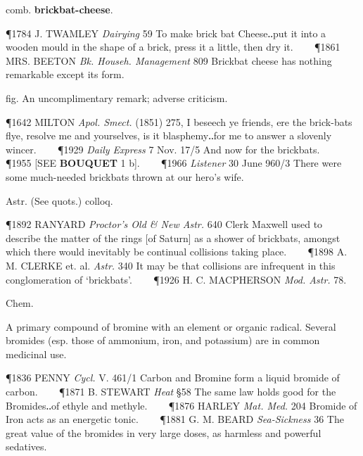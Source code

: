 \begin{description}[wide, labelwidth=!, labelindent=0pt]
\begin{myenumerate}
 comb. \textbf{brickbat-cheese}.

\P 1784 J. TWAMLEY  \textit{Dairying} 59 To make brick bat Cheese‥put it into a wooden mould in the shape of a brick, press it a little, then dry it.    
\P 1861 MRS. BEETON  \textit{Bk. Househ. Management} 809 Brickbat cheese has nothing remarkable except its form.

 fig. An uncomplimentary remark; adverse criticism.

\P 1642 MILTON  \textit{Apol. Smect.} (1851) 275, I beseech ye friends, ere the brick-bats flye, resolve me and yourselves, is it blasphemy‥for me to answer a slovenly wincer.    
\P 1929 \textit{Daily  Express} 7 Nov. 17/5 And now for the brickbats.    
\P 1955 [SEE  \textbf{BOUQUET} 1 b].    
\P 1966 \textit{Listener}  30 June 960/3 There were some much-needed brickbats thrown at our hero's wife.

 Astr. (See quots.) colloq.

\P 1892 RANYARD  \textit{Proctor's Old \& New Astr.} 640 Clerk Maxwell used to describe the matter of the rings [of Saturn] as a shower of brickbats, amongst which there would inevitably be continual collisions taking place.    
\P 1898 A. M. CLERKE et. al. \textit{Astr.} 340 It may be that collisions are infrequent in this conglomeration of ‘brickbats’.    
\P 1926 H. C. MACPHERSON  \textit{Mod. Astr.} 78.
\end{myenumerate}


 Chem.

\noindent {}

\vspace{-0.3cm}

\begin{myenumerate}

 A primary compound of bromine with an element or organic radical. Several bromides (esp. those of ammonium, iron, and potassium) are in common medicinal use.

\P 1836 PENNY  \textit{Cycl.} V. 461/1 Carbon and Bromine form a liquid bromide of carbon.    
\P 1871 B. STEWART  \textit{Heat} §58 The same law holds good for the Bromides‥of ethyle and methyle.    
\P 1876 HARLEY  \textit{Mat. Med.} 204 Bromide of Iron acts as an energetic tonic.    
\P 1881 G. M. BEARD  \textit{Sea-Sickness} 36 The great value of the bromides in very large doses, as harmless and powerful sedatives.


\end{myenumerate}
\end{description}
